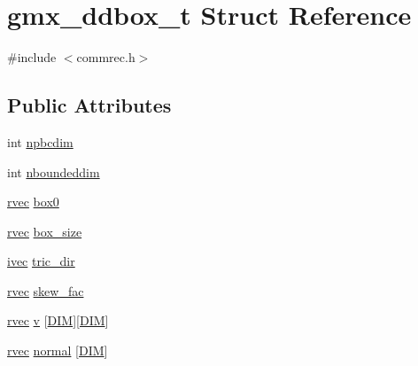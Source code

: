 \hypertarget{structgmx__ddbox__t}{\section{gmx\-\_\-ddbox\-\_\-t \-Struct \-Reference}
\label{structgmx__ddbox__t}
}


{\ttfamily \#include $<$commrec.\-h$>$}

\subsection*{\-Public \-Attributes}
\begin{DoxyCompactItemize}
\item 
int \hyperlink{structgmx__ddbox__t_a59ca78e17b4de75f33d0e7298cf2ab80}{npbcdim}
\item 
int \hyperlink{structgmx__ddbox__t_abdb8863bdc4a0ede8af5a610df6d6657}{nboundeddim}
\item 
\hyperlink{share_2template_2gromacs_2types_2simple_8h_aa02a552a4abd2f180c282a083dc3a999}{rvec} \hyperlink{structgmx__ddbox__t_a0817b838d4ddf9ac2abf3e4b3b11f7bc}{box0}
\item 
\hyperlink{share_2template_2gromacs_2types_2simple_8h_aa02a552a4abd2f180c282a083dc3a999}{rvec} \hyperlink{structgmx__ddbox__t_a00ddbac275a7b5d79b3d1b98de42ad76}{box\-\_\-size}
\item 
\hyperlink{share_2template_2gromacs_2types_2simple_8h_a74f6ffdb4a9c1764f5293969d8c681b6}{ivec} \hyperlink{structgmx__ddbox__t_a89edc2fc52bc259388b85423baf5f6ae}{tric\-\_\-dir}
\item 
\hyperlink{share_2template_2gromacs_2types_2simple_8h_aa02a552a4abd2f180c282a083dc3a999}{rvec} \hyperlink{structgmx__ddbox__t_affcb74917f4431a27d6e044bafcf6f10}{skew\-\_\-fac}
\item 
\hyperlink{share_2template_2gromacs_2types_2simple_8h_aa02a552a4abd2f180c282a083dc3a999}{rvec} \hyperlink{structgmx__ddbox__t_a53afe462d7aa177bab06b0676e44f8c1}{v} \mbox{[}\hyperlink{share_2template_2gromacs_2types_2simple_8h_ac25189db92959bff3c6c2adf4c34b50a}{\-D\-I\-M}\mbox{]}\mbox{[}\hyperlink{share_2template_2gromacs_2types_2simple_8h_ac25189db92959bff3c6c2adf4c34b50a}{\-D\-I\-M}\mbox{]}
\item 
\hyperlink{share_2template_2gromacs_2types_2simple_8h_aa02a552a4abd2f180c282a083dc3a999}{rvec} \hyperlink{structgmx__ddbox__t_add0e9153aab56500db4bbcddb4478cb8}{normal} \mbox{[}\hyperlink{share_2template_2gromacs_2types_2simple_8h_ac25189db92959bff3c6c2adf4c34b50a}{\-D\-I\-M}\mbox{]}
\end{DoxyCompactItemize}


